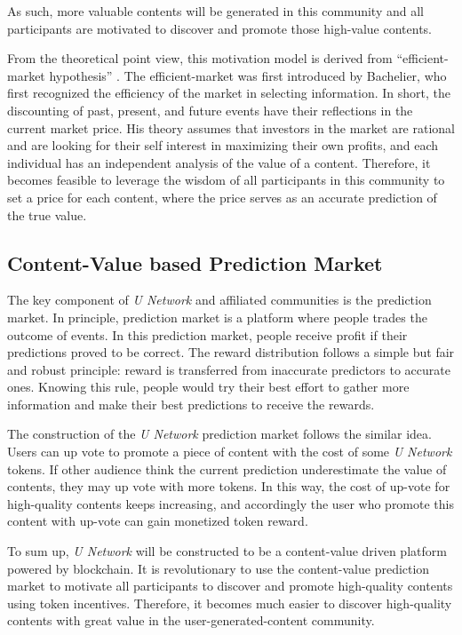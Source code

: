 As such, more valuable contents will be generated in this community and all participants are motivated to discover and promote those high-value contents. 

From the theoretical point view, this motivation model is derived from ``efficient-market hypothesis'' \cite{efficient}.  The efficient-market was first introduced by Bachelier, who first recognized the efficiency of the market in selecting information. In short, the discounting of past, present, and future events have their reflections in the current market price. His theory assumes that investors in the market are rational and are looking for their self interest in maximizing their own profits, and each individual has an independent analysis of the value of a content. Therefore, it becomes feasible to leverage the wisdom of all participants in this community to set a price for each content, where the price serves as an accurate prediction of the true value.  

\subsection{Content-Value based Prediction Market}
The key component of  \emph{U Network} and affiliated communities is the prediction market. In principle, prediction market\cite{prediction} is a platform where people trades the outcome of events. In this prediction market, people receive profit if their predictions proved to be correct. The reward distribution follows a simple but fair and robust principle: reward is transferred from inaccurate predictors to accurate ones. Knowing this rule, people would try their best effort to gather more information and make their best predictions to receive the rewards.

The construction of the  \emph{U Network} prediction market follows the similar idea. Users can up vote to promote a piece of content with the cost of some \emph{U Network} tokens. If other audience think the current prediction underestimate the value of contents, they may up vote with more tokens. In this way, the cost of up-vote for high-quality contents keeps increasing, and accordingly the user who promote this content with up-vote can gain monetized token reward. 

To sum up,  \emph{U Network} will be constructed to be a content-value driven platform powered by blockchain. It is revolutionary to use the content-value prediction market to motivate all participants to discover and promote high-quality contents using token incentives. Therefore, it becomes much easier to discover high-quality contents with great value in the user-generated-content community.






